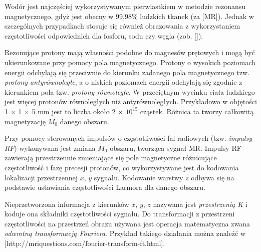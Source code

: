 Wodór jest najczęściej wykorzystywanym pierwiastkiem w metodzie rezonansu magnetycznego, gdyż jest obecny w 99,98\% ludzkich tkanek (za [MR]). Jednak w szczególnych przypadkach stosuje się również obrazowania z wykorzystaniem częstotliwości odpowiednich dla fosforu, sodu czy węgla (zob. []).

Rezonujące protony mają własności podobne do magnesów prętowych i mogą być ukierunkowane przy pomocy pola magnetycznego. Protony o wysokich poziomach energii odchylają się przeciwnie do kierunku zadanego pola magnetycznego tzw. \textit{protony antyrównoległe}, a o niskich poziomach energii odchylają się zgodnie z kierunkiem pola tzw. \textit{protony równoległe}. W przeciętnym wycinku ciała ludzkiego jest więcej protonów równoległych niż antyrównoległych. Przykładowo w objętości 1 $\times$ 1 $\times$ 5 mm jest to liczba około 2 $\times$ $10^{15}$ cząstek. Różnica ta tworzy całkowitą magnetyzację $M_0$ danego obszaru.

Przy pomocy sterowanych impulsów o częstotliwości fal radiowych (tzw. \textit{impulsy RF}) wykonywana jest zmiana $M_0$ obszaru, tworząca sygnał MR. Impulsy RF zawierają przestrzennie zmieniające się pole magnetyczne różnicujące częstotliwość i fazę precesji protonów, co wykorzystywane jest do kodowania lokalizacji przestrzennej $x$, $y$ sygnału. Kodowanie warstwy $z$ odbywa się na podstawie ustawiania częstotliwości Larmora dla danego obszaru.

Nieprzetworzona informacja z kierunków $x$, $y$, $z$ nazywana jest \textit{przestrzenią K} i koduje ona składniki częstotliwości sygnału. Do transformacji z przestrzeni częstotliwości na przestrzeń obrazu używana jest operacja matematyczna zwana \textit{odwrotną transformacją Fouriera}. Przykład takiego działania można znaleźć w [http://mriquestions.com/fourier-transform-ft.html].

